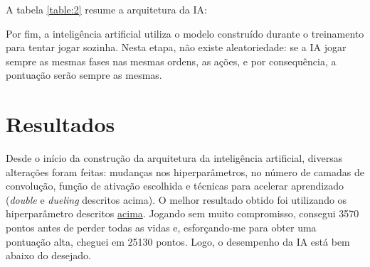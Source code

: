 A tabela \ref{table:2} resume a arquitetura da IA:

Por fim, a inteligência artificial utiliza o modelo construído durante o treinamento para tentar jogar sozinha. Nesta etapa, não existe aleatoriedade: se a IA jogar sempre as mesmas fases nas mesmas ordens, as ações, e por consequência, a pontuação serão sempre as mesmas.

\section{Resultados}
\label{sec:res}

Desde o início da construção da arquitetura da inteligência artificial, diversas alterações foram feitas: mudanças nos hiperparâmetros, no número de camadas de convolução, função de ativação escolhida e técnicas para acelerar aprendizado (\textit{double} e \textit{dueling} descritos acima).
O melhor resultado obtido foi utilizando os hiperparâmetro descritos \hyperref[table:2]{acima}.
Jogando sem muito compromisso, consegui 3570 pontos antes de perder todas as vidas e, esforçando-me para obter uma pontuação alta, cheguei em 25130 pontos.
Logo, o desempenho da IA está bem abaixo do desejado.


